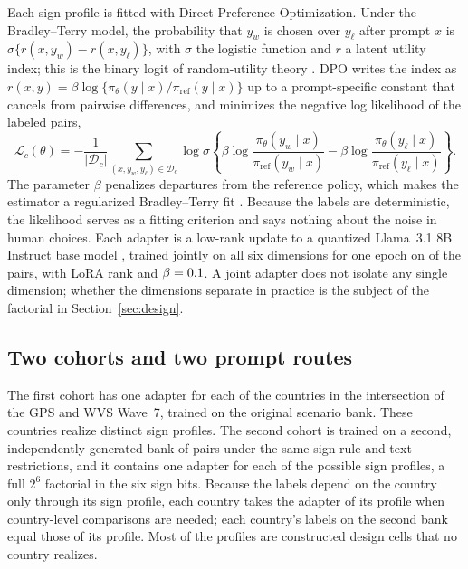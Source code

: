 Each sign profile is fitted with Direct Preference Optimization. Under the Bradley--Terry model, the probability that $y_w$ is chosen over $y_\ell$ after prompt $x$ is $\sigma\{r(x,y_w)-r(x,y_\ell)\}$, with $\sigma$ the logistic function and $r$ a latent utility index; this is the binary logit of random-utility theory \citep{bradleyterry1952}. DPO writes the index as $r(x,y)=\beta\log\{\pi_\theta(y\mid x)/\pi_{\mathrm{ref}}(y\mid x)\}$ up to a prompt-specific constant that cancels from pairwise differences, and minimizes the negative log likelihood of the labeled pairs,
\begin{equation}
\mathcal{L}_c(\theta)=-\frac{1}{|\mathcal{D}_c|}\sum_{(x,y_w,y_\ell)\in\mathcal{D}_c}\log\sigma\!\left\{\beta\log\frac{\pi_\theta(y_w\mid x)}{\pi_{\mathrm{ref}}(y_w\mid x)}-\beta\log\frac{\pi_\theta(y_\ell\mid x)}{\pi_{\mathrm{ref}}(y_\ell\mid x)}\right\}.
\label{eq:dpo}
\end{equation}
The parameter $\beta$ penalizes departures from the reference policy, which makes the estimator a regularized Bradley--Terry fit \citep{rafailov2023}. Because the labels are deterministic, the likelihood serves as a fitting criterion and says nothing about the noise in human choices. Each adapter is a low-rank update to a quantized Llama~3.1 8B Instruct base model \citep{hu2022,dettmers2023}, trained jointly on all six dimensions for one epoch on  of the  pairs, with LoRA rank  and $\beta=\dc{0.1}{dpo_beta}$. A joint adapter does not isolate any single dimension; whether the dimensions separate in practice is the subject of the factorial in Section~\ref{sec:design}.

\subsection{Two cohorts and two prompt routes}

The first cohort has one adapter for each of the  countries in the intersection of the GPS and WVS Wave~7, trained on the original scenario bank. These countries realize  distinct sign profiles. The second cohort is trained on a second, independently generated bank of  pairs under the same sign rule and text restrictions, and it contains one adapter for each of the  possible sign profiles, a full $2^6$ factorial in the six sign bits. Because the labels depend on the country only through its sign profile, each country takes the adapter of its profile when country-level comparisons are needed; each country's labels on the second bank equal those of its profile. Most of the  profiles are constructed design cells that no country realizes.

